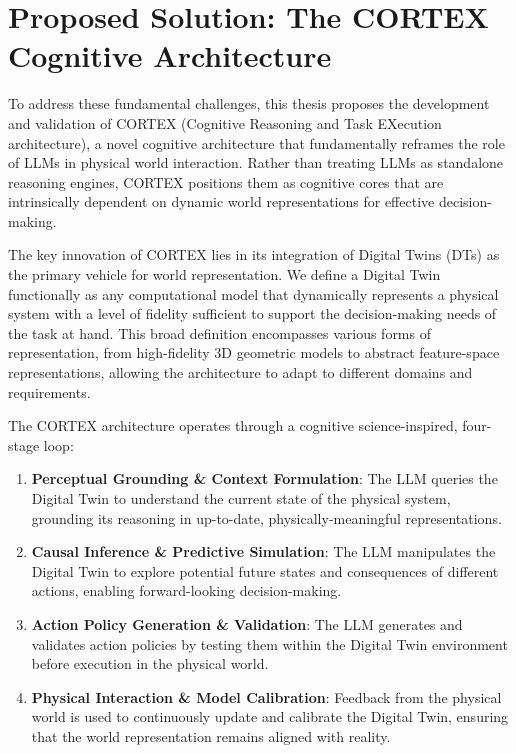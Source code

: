 \section{Proposed Solution: The CORTEX Cognitive Architecture}

To address these fundamental challenges, this thesis proposes the development and validation of CORTEX (Cognitive Reasoning and Task EXecution architecture), a novel cognitive architecture that fundamentally reframes the role of LLMs in physical world interaction. Rather than treating LLMs as standalone reasoning engines, CORTEX positions them as cognitive cores that are intrinsically dependent on dynamic world representations for effective decision-making.

The key innovation of CORTEX lies in its integration of Digital Twins (DTs) as the primary vehicle for world representation. We define a Digital Twin functionally as any computational model that dynamically represents a physical system with a level of fidelity sufficient to support the decision-making needs of the task at hand. This broad definition encompasses various forms of representation, from high-fidelity 3D geometric models to abstract feature-space representations, allowing the architecture to adapt to different domains and requirements.

The CORTEX architecture operates through a cognitive science-inspired, four-stage loop:

\begin{enumerate}
    \item \textbf{Perceptual Grounding \& Context Formulation}: The LLM queries the Digital Twin to understand the current state of the physical system, grounding its reasoning in up-to-date, physically-meaningful representations.
    
    \item \textbf{Causal Inference \& Predictive Simulation}: The LLM manipulates the Digital Twin to explore potential future states and consequences of different actions, enabling forward-looking decision-making.
    
    \item \textbf{Action Policy Generation \& Validation}: The LLM generates and validates action policies by testing them within the Digital Twin environment before execution in the physical world.
    
    \item \textbf{Physical Interaction \& Model Calibration}: Feedback from the physical world is used to continuously update and calibrate the Digital Twin, ensuring that the world representation remains aligned with reality.
\end{enumerate}

